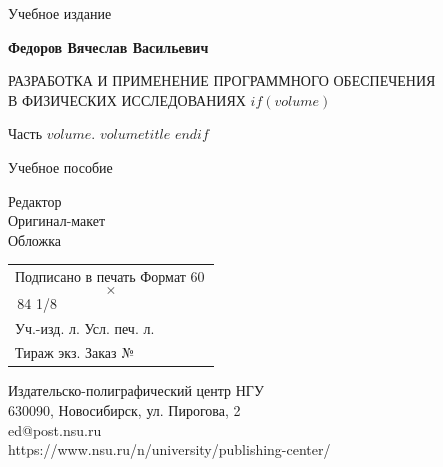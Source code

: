 \documentclass[12pt,oneside]{book}
\begin{document}
\clearpage
\thispagestyle{empty}
\vspace*{\fill}
\begin{center}
{\small
Учебное издание
\vspace{6mm}

\textbf{Федоров Вячеслав Васильевич}
\vspace{4mm}

РАЗРАБОТКА И ПРИМЕНЕНИЕ ПРОГРАММНОГО ОБЕСПЕЧЕНИЯ\\
В ФИЗИЧЕСКИХ ИССЛЕДОВАНИЯХ
$if(volume)$

Часть $volume$. $volumetitle$
$endif$
\vspace{4mm}

Учебное пособие
\vspace{10mm}

Редактор \underline{\hspace{30mm}}\\
Оригинал-макет \underline{\hspace{30mm}}\\
Обложка \underline{\hspace{30mm}}
\vspace{8mm}

\begin{tabular}{@{}l@{}}
Подписано в печать \underline{\hspace{20mm}}\quad Формат 60\,$$\times$$\,84 1/8\\
Уч.-изд. л. \underline{\hspace{12mm}}\quad
Усл. печ. л. \underline{\hspace{12mm}}\\
Тираж \underline{\hspace{12mm}} экз. \quad Заказ № \underline{\hspace{12mm}}\\
\end{tabular}
\vspace{8mm}

Издательско-полиграфический центр НГУ\\
630090, Новосибирск, ул. Пирогова, 2\\
ed@post.nsu.ru\\
https://www.nsu.ru/n/university/publishing-center/
}
\end{center}
\label{LastPage}
\end{document}
